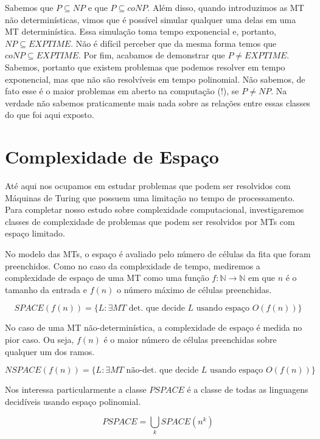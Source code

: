 Sabemos que $P \subseteq NP$ e que $P \subseteq coNP$.
Além disso, quando introduzimos as MT não determinísticas, vimos que é possível simular qualquer uma delas em uma MT determinística.
Essa simulação toma tempo exponencial e, portanto, $NP \subseteq EXPTIME$.
Não é difícil perceber que da mesma forma temos que $coNP \subseteq EXPTIME$.
Por fim, acabamos de demonstrar que $P \neq EXPTIME$.
Sabemos, portanto que existem problemas que podemos resolver em tempo exponencial, mas que não são resolvíveis em tempo polinomial.
Não sabemos, de fato esse é o maior problemas em aberto na computação (!), se $P \neq NP$.
Na verdade não sabemos praticamente mais nada sobre as relações entre essas classes do que foi aqui exposto.

\section{Complexidade de Espaço}
\label{sec:espaco}

Até aqui nos ocupamos em estudar problemas que podem ser resolvidos com Máquinas de Turing que possuem uma limitação no tempo de processamento.
Para completar nosso estudo sobre complexidade computacional, investigaremos classes de complexidade de problemas que podem ser resolvidos por MTs com espaço limitado.

No modelo das MTs, o espaço é avaliado pelo número de células da fita que foram preenchidos.
Como no caso da complexidade de tempo, mediremos a complexidade de espaço de uma MT como uma função $f: \mathbb{N} \to \mathbb{N}$ em que $n$ é o tamanho da entrada e $f(n)$ o número máximo de células preenchidas.

\begin{displaymath}
  SPACE(f(n)) = \{ L : \exists MT \textrm{ det. que decide $L$ usando espaço $O(f(n))$} \}
\end{displaymath}

No caso de uma MT não-determinística, a complexidade de espaço é medida no pior caso.
Ou seja, $f(n)$ é o maior número de células preenchidas sobre qualquer um dos ramos.

\begin{displaymath}
  NSPACE(f(n)) = \{ L : \exists MT \textrm{ não-det. que decide $L$ usando espaço $O(f(n))$} \}
\end{displaymath}

Nos interessa particularmente a classe $PSPACE$ é a classe de todas as linguagens decidíveis usando espaço polinomial.

\begin{displaymath}
  PSPACE = \bigcup_k SPACE(n^k)
\end{displaymath}

